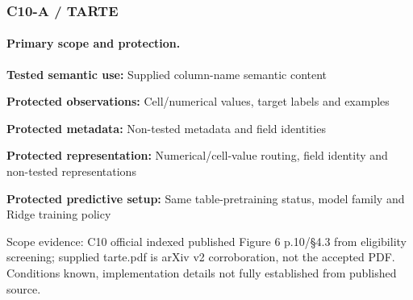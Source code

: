\documentclass[10pt]{article}
\begin{document}
\subsubsection*{C10-A / TARTE}
\paragraph{Primary scope and protection.}
\textbf{Tested semantic use:} Supplied column-name semantic content\par
\textbf{Protected observations:} Cell/numerical values, target labels and examples\par
\textbf{Protected metadata:} Non-tested metadata and field identities\par
\textbf{Protected representation:} Numerical/cell-value routing, field identity and non-tested representations\par
\textbf{Protected predictive setup:} Same table-pretraining status, model family and Ridge training policy\par
Scope evidence: C10 official indexed published Figure 6 p.10/§4.3 from eligibility screening; supplied tarte.pdf is arXiv v2 corroboration, not the accepted PDF. Conditions known, implementation details not fully established from published source.\par
\end{document}

